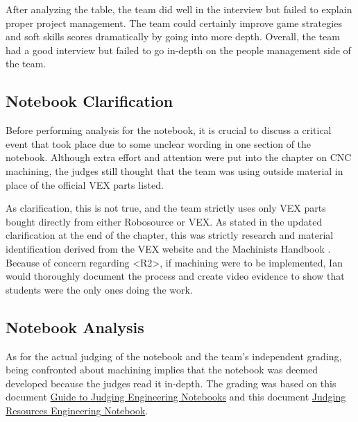 After analyzing the table, the team did well in the interview but failed to explain proper project management. The team could certainly improve game strategies and soft skills scores dramatically by going into more depth. Overall, the team had a good interview but failed to go in-depth on the people management side of the team.

\subsection*{Notebook Clarification}
Before performing analysis for the notebook, it is crucial to discuss a critical event that took place due to some unclear wording in one section of the notebook. Although extra effort and attention were put into the chapter on CNC machining, the judges still thought that the team was using outside material in place of the official VEX parts listed.

As clarification, this is not true, and the team strictly uses only VEX parts bought directly from either Robosource or VEX. As stated in the updated clarification at the end of the chapter, this was strictly research and material identification derived from the VEX website \cite{vexRobotics} and the Machinists Handbook \cite{machinists}. Because of concern regarding \textless R2\textgreater, if machining were to be implemented, Ian would thoroughly document the process and create video evidence to show that students were the only ones doing the work.

\subsection*{Notebook Analysis}
As for the actual judging of the notebook and the team’s independent grading, being confronted about machining implies that the notebook was deemed developed because the judges read it in-depth. The grading was based on this document \href{https://v5rc-kb.recf.org/hc/en-us/articles/9681296966423-Guide-to-Judging-Judging-Engineering-Notebooks}{Guide to Judging Engineering Notebooks} and this document \href{https://kb.roboticseducation.org/hc/en-us/articles/4461349729047-Judging-Resource-Engineering-Notebook-Rubric}{Judging Resources Engineering Notebook}.

